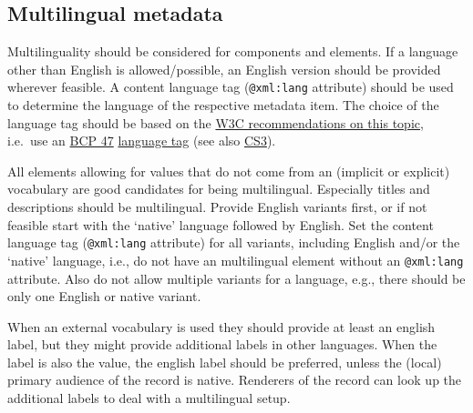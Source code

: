 \subsection{Multilingual metadata}\label{multilingual-metadata}

Multilinguality should be considered for components and elements. If a
language other than English is allowed/possible, an English version
should be provided wherever feasible. A content language tag
(\texttt{@xml:lang} attribute) should be used to determine the language
of the respective metadata item. The choice of the language tag should
be based on the
\href{https://www.w3.org/International/questions/qa-choosing-language-tags}{W3C
recommendations on this topic}, i.e.~use an
\href{https://tools.ietf.org/rfc/bcp/bcp47.txt}{BCP 47}
\href{https://www.iana.org/assignments/language-subtag-registry/language-subtag-registry}{language
tag} (see also
\href{/authoring_component_metadata_records/the_component_section.md\#cs3}{CS3}).

All elements allowing for values that do not come from an (implicit or
explicit) vocabulary are good candidates for being multilingual.
Especially titles and descriptions should be multilingual. Provide
English variants first, or if not feasible start with the `native'
language followed by English. Set the content language tag
(\texttt{@xml:lang} attribute) for all variants, including English
and/or the `native' language, i.e., do not have an multilingual element
without an \texttt{@xml:lang} attribute. Also do not allow multiple
variants for a language, e.g., there should be only one English or
native variant.

When an external vocabulary is used they should provide at least an
english label, but they might provide additional labels in other
languages. When the label is also the value, the english label should be
preferred, unless the (local) primary audience of the record is native.
Renderers of the record can look up the additional labels to deal with a
multilingual setup.
